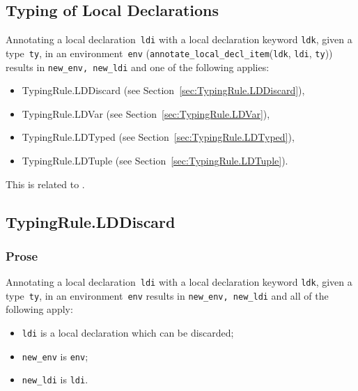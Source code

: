 \documentclass{book}
\newcommand\annotatelocaldeclitem[1]{\texttt{annotate\_local\_decl\_item}(#1)}
\newcommand\ldi[0]{\texttt{ldi}}
\newcommand\ldk[0]{\texttt{ldk}}
\newcommand\tty[0]{\texttt{ty}}
\begin{document}
\begin{itemize}

\chapter{Typing of Local Declarations}

Annotating a local declaration~\texttt{ldi} with a local declaration keyword \texttt{ldk}, given a type~\texttt{ty}, in an
environment~\texttt{env} (\annotatelocaldeclitem{\ldk, \ldi, \tty}) results in \texttt{new\_env, new\_ldi} and one of the following applies:
\begin{itemize}
\item TypingRule.LDDiscard (see Section~\ref{sec:TypingRule.LDDiscard}),
\item TypingRule.LDVar (see Section~\ref{sec:TypingRule.LDVar}),
\item TypingRule.LDTyped (see Section~\ref{sec:TypingRule.LDTyped}),
\item TypingRule.LDTuple (see Section~\ref{sec:TypingRule.LDTuple}).
\end{itemize}

This is related to .

\section{TypingRule.LDDiscard \label{sec:TypingRule.LDDiscard}}

  \subsection{Prose}
    Annotating a local declaration~\texttt{ldi} with a local declaration keyword \texttt{ldk}, given a type~\texttt{ty}, in
an environment~\texttt{env} results in \texttt{new\_env, new\_ldi} and all of
the following apply:
   \begin{itemize}
   \item \texttt{ldi} is a local declaration which can be discarded;
   \item \texttt{new\_env} is \texttt{env};
   \item \texttt{new\_ldi} is \texttt{ldi}.
   \end{itemize}


\end{itemize}
\end{document}
